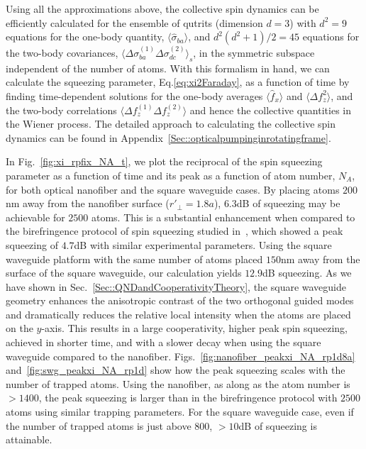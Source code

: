 \documentclass[preprint,aps,pra,onecolumn,superscriptaddress]{revtex4-1} %
\newcommand{\expect}[1]{\big\langle #1 \big\rangle}
\begin{document}
Using all the approximations above, the collective spin dynamics can be efficiently calculated for the ensemble of qutrits (dimension  $d=3$) with $ d^2=9 $ equations for the one-body quantity, $ \expect{\hat{\sigma}_{ba}} $, and $ d^2(d^2+1)/2=45 $ equations for the two-body covariances, $ \expect{\Delta \sigma_{ba}^{(1)}\Delta\sigma_{dc}^{(2)} }_s $, in the symmetric subspace independent of the number of atoms.  With this formalism in hand, we can calculate the squeezing parameter, Eq.\eqref{eq:xi2Faraday}, as a function of time by finding time-dependent solutions for the one-body averages $\expect{\hat{f}_x}$ and  $\expect{\Delta f_z^2}$, and the two-body correlations $\expect{\Delta f_z^{(1)} \Delta f_z^{(2)}}$ and hence the collective quantities in the Wiener process.  The detailed approach to calculating the collective spin dynamics can be found in Appendix~\ref{Sec::opticalpumpinginrotatingframe}. 

In Fig.~\ref{fig:xi_rpfix_NA_t}, we plot the reciprocal of the spin squeezing parameter as a function of time and its peak as a function of atom number, $ N_A $, for both optical nanofiber and the square waveguide cases. By placing atoms $ 200 $nm away from the nanofiber surface ($ r'\!_\perp=1.8a $), $ 6.3 $dB of squeezing may be achievable for $ 2500 $ atoms. This is a substantial enhancement when compared to the birefringence protocol of spin squeezing  studied in~\cite{Qi2016}, which showed a peak squeezing  of $ 4.7 $dB with  similar experimental parameters. Using the square waveguide platform with the same number of atoms placed $150 $nm away from the surface of the square waveguide, our calculation yields $12.9$dB squeezing. As we have shown in Sec.~\ref{Sec::QNDandCooperativityTheory}, the square waveguide geometry enhances the anisotropic contrast of the two orthogonal guided modes and dramatically reduces the relative local intensity when the atoms are placed on the $ y $-axis. This results in a large cooperativity, higher peak spin squeezing, achieved in shorter time, and with a slower decay when using the square waveguide compared to the nanofiber. Figs.~\ref{fig:nanofiber_peakxi_NA_rp1d8a} and~\ref{fig:swg_peakxi_NA_rp1d} show how the peak squeezing scales with the number of trapped atoms. Using the nanofiber, as along as the atom number is  $>1400 $, the peak  squeezing  is larger than in the birefringence protocol with $ 2500 $ atoms using similar trapping parameters. For the square waveguide case, even if the number of trapped atoms is just above $ 800 $, $ >10 $dB of  squeezing is attainable. 
\end{document}
